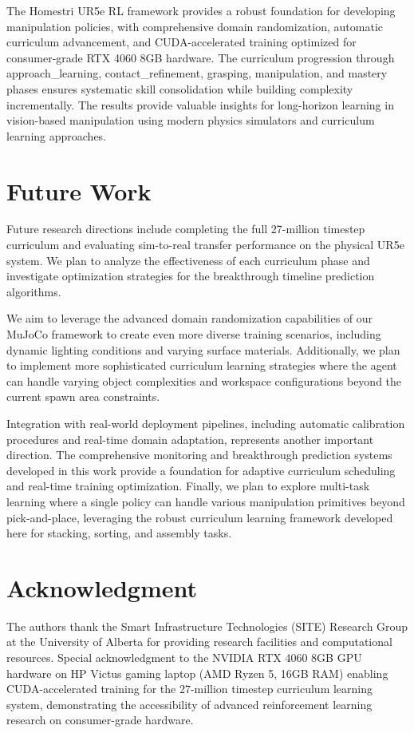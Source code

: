 \documentclass[conference]{IEEEtran}
\begin{document}
The Homestri UR5e RL framework provides a robust foundation for developing manipulation policies, with comprehensive domain randomization, automatic curriculum advancement, and CUDA-accelerated training optimized for consumer-grade RTX 4060 8GB hardware. The curriculum progression through approach\_learning, contact\_refinement, grasping, manipulation, and mastery phases ensures systematic skill consolidation while building complexity incrementally. The results provide valuable insights for long-horizon learning in vision-based manipulation using modern physics simulators and curriculum learning approaches.

\section{Future Work}
Future research directions include completing the full 27-million timestep curriculum and evaluating sim-to-real transfer performance on the physical UR5e system. We plan to analyze the effectiveness of each curriculum phase and investigate optimization strategies for the breakthrough timeline prediction algorithms. 

We aim to leverage the advanced domain randomization capabilities of our MuJoCo framework to create even more diverse training scenarios, including dynamic lighting conditions and varying surface materials. Additionally, we plan to implement more sophisticated curriculum learning strategies where the agent can handle varying object complexities and workspace configurations beyond the current spawn area constraints.

Integration with real-world deployment pipelines, including automatic calibration procedures and real-time domain adaptation, represents another important direction. The comprehensive monitoring and breakthrough prediction systems developed in this work provide a foundation for adaptive curriculum scheduling and real-time training optimization. Finally, we plan to explore multi-task learning where a single policy can handle various manipulation primitives beyond pick-and-place, leveraging the robust curriculum learning framework developed here for stacking, sorting, and assembly tasks.

\section*{Acknowledgment}
The authors thank the Smart Infrastructure Technologies (SITE) Research Group at the University of Alberta for providing research facilities and computational resources. Special acknowledgment to the NVIDIA RTX 4060 8GB GPU hardware on HP Victus gaming laptop (AMD Ryzen 5, 16GB RAM) enabling CUDA-accelerated training for the 27-million timestep curriculum learning system, demonstrating the accessibility of advanced reinforcement learning research on consumer-grade hardware.
\end{document}
